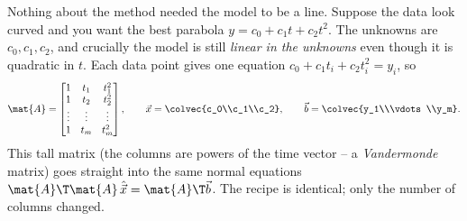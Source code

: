 Nothing about the method needed the model to be a line. Suppose the data look curved and you want
the best parabola $y=c_0+c_1 t+c_2 t^2$. The unknowns are $c_0,c_1,c_2$, and crucially the model
is still \emph{linear in the unknowns} even though it is quadratic in $t$. Each data point gives
one equation $c_0+c_1 t_i + c_2 t_i^2 = y_i$, so
\[
  \mat{A}=\begin{bmatrix}
    1 & t_1 & t_1^2\\
    1 & t_2 & t_2^2\\
    \vdots & \vdots & \vdots\\
    1 & t_m & t_m^2
  \end{bmatrix},
  \qquad
  \vec{x}=\colvec{c_0\\c_1\\c_2},
  \qquad
  \vec{b}=\colvec{y_1\\\vdots\\y_m}.
\]
This tall matrix (the columns are powers of the time vector -- a \emph{Vandermonde} matrix) goes
straight into the same normal equations $\mat{A}\T\mat{A}\,\hat{\vec{x}}=\mat{A}\T\vec{b}$. The
recipe is identical; only the number of columns changed.

